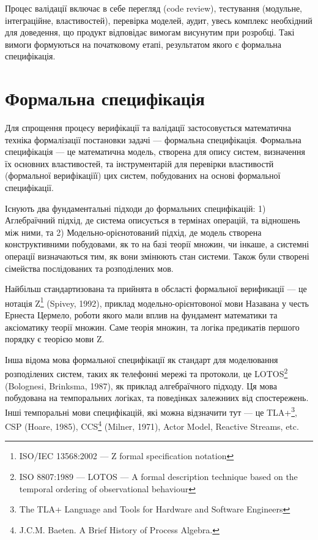Процес валідації включає в себе перегляд (code review),
тестування (модульне, інтеграційне, властивостей), перевірка моделей, аудит,
увесь комплекс необхідний для доведення, що продукт відповідає вимогам
висунутим при розробці. Такі вимоги формуються на початковому етапі,
результатом якого є формальна специфікація.

\section {Формальна специфікація}
Для спрощення процесу верифікації та валідації
застосовується математична техніка формалізації постановки задачі --- формальна специфікація.
Формальна специфікація --- це математична модель, створена для опису систем,
визначення їх основних властивостей, та інструментарій для перевірки
властивостй (формальної верифікаціїї) цих систем, побудованих на основі формальної специфікації.

Існують два фундаментальні підходи до формальних специфікацій: 1) Аглебраїчний підхід, де
система описується в термінах операцій, та відношень між ними, та
2) Модельно-орієнотований підхід, де модель створена конструктивними побудовами,
як то на базі теорії множин, чи інкаше, а системні операції визначаються тим, як вони змінюють
стан системи. Також були створені сімейства послідованих та розподілених мов.

Найбільш стандартизована та прийнята в обсласті формальної верификації --- це нотація
Z\footnote{ISO/IEC 13568:2002 --- Z formal specification notation} (Spivey, 1992), приклад
модельно-орієнтовоної мови
Назавана у честь Ернеста Цермело, роботи якого мали вплив на фундамент математики та аксіоматику
теорії множин. Саме теорія множин, та логіка предикатів першого порядку є теорією мови Z.

Інша відома мова формальної специфікації як стандарт для моделювання розподілених систем,
таких як телефонні мережі та протоколи, це
LOTOS\footnote{ISO 8807:1989 --- LOTOS --- A formal description technique based
on the temporal ordering of observational behaviour} (Bolognesi, Brinksma, 1987), як приклад алгебраїчного підходу.
Ця мова побудована на темпоральних логіках, та поведінках залежниих від спостережень.
Інші темпоральні мови специфікацій, які можна відзначити тут --- це TLA+\footnote{The
TLA+ Language and Tools for Hardware and Software Engineers}, CSP (Hoare, 1985),
CCS\footnote{J.C.M. Baeten. A Brief History of Process Algebra.} (Milner, 1971), Actor Model, Reactive Streams, etc.


